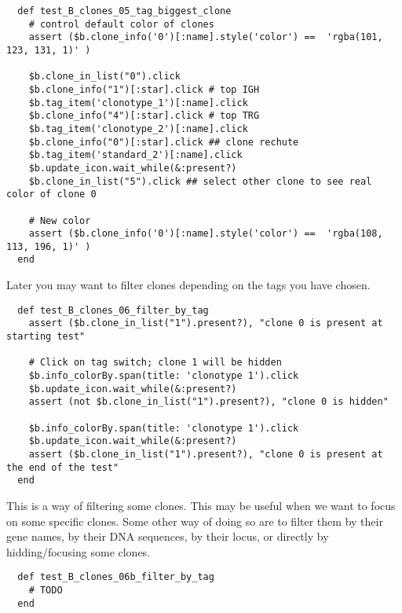 \begin{verbatim}
  def test_B_clones_05_tag_biggest_clone
    # control default color of clones
    assert ($b.clone_info('0')[:name].style('color') ==  'rgba(101, 123, 131, 1)' )

    $b.clone_in_list("0").click
    $b.clone_info("1")[:star].click # top IGH
    $b.tag_item('clonotype_1')[:name].click
    $b.clone_info("4")[:star].click # top TRG 
    $b.tag_item('clonotype_2')[:name].click
    $b.clone_info("0")[:star].click ## clone rechute
    $b.tag_item('standard_2')[:name].click
    $b.update_icon.wait_while(&:present?)
    $b.clone_in_list("5").click ## select other clone to see real color of clone 0

    # New color
    assert ($b.clone_info('0')[:name].style('color') ==  'rgba(108, 113, 196, 1)' )
  end
\end{verbatim}

Later you may want to filter clones depending on the tags you have chosen.


\begin{verbatim}
  def test_B_clones_06_filter_by_tag
    assert ($b.clone_in_list("1").present?), "clone 0 is present at starting test"

    # Click on tag switch; clone 1 will be hidden
    $b.info_colorBy.span(title: 'clonotype 1').click
    $b.update_icon.wait_while(&:present?)
    assert (not $b.clone_in_list("1").present?), "clone 0 is hidden"

    $b.info_colorBy.span(title: 'clonotype 1').click
    $b.update_icon.wait_while(&:present?)
    assert ($b.clone_in_list("1").present?), "clone 0 is present at the end of the test"
  end
\end{verbatim}

This is a way of filtering some clones. This may be useful when we want to
focus on some specific clones. Some other way of doing so are to filter them by
their gene names, by their DNA sequences, 
by their locus,
or directly by hidding/focusing some clones.


\begin{verbatim}
  def test_B_clones_06b_filter_by_tag
    # TODO
  end
\end{verbatim}

